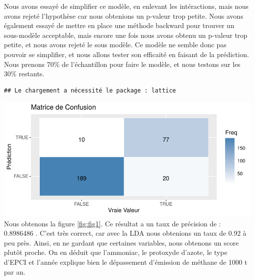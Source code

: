 \documentclass[
]{article}
\begin{document}
Nous avons essayé de simplifier ce modèle, en enlevant les intéractions,
mais nous avons rejeté l'hypothèse car nous obtenions un p-valeur trop
petite. Nous avons également essayé de mettre en place une méthode
backward pour trouver un sous-modèle acceptable, mais encore une fois
nous avons obtenu un p-valeur trop petite, et nous avons rejeté le sous
modèle. Ce modèle ne semble donc pas pouvoir se simplifier, et nous
allons tester son efficaité en faisant de la prédiction. Nous prenons
70\% de l'échantillon pour faire le modèle, et nous testons sur les 30\%
restants.

\begin{verbatim}
## Le chargement a nécessité le package : lattice
\end{verbatim}

\includegraphics{Question-6_files/figure-latex/fig1-1.pdf} Nous obtenons
la figure \ref{fig:fig1}. Ce résultat a un taux de précision de :
0.8986486 . C'est très correct, car avec la LDA nous obtenions un taux
de 0.92 à peu près. Ainsi, en ne gardant que certaines variables, nous
obtenons un score plutôt proche. On en déduit que l'ammoniac, le
protoxyde d'azote, le type d'EPCI et l'année explique bien le
dépassement d'émission de méthane de 1000 t par an.
\end{document}
